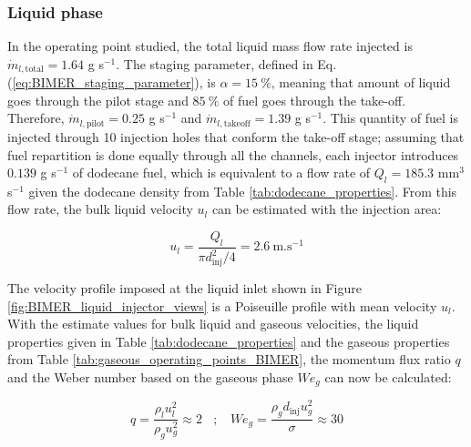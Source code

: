 \subsubsection*{Liquid phase}

In the operating point studied, the total liquid mass flow rate injected is $\dot{m}_{l,\mathrm{total}} = 1.64$ g s$^{-1}$. The staging parameter, defined in Eq. (\ref{eq:BIMER_staging_parameter}), is $\alpha = 15 ~\%$, meaning that amount of liquid goes through the pilot stage and $85 ~\%$ of fuel goes through the take-off. Therefore, $\dot{m}_{l,\mathrm{pilot}} = 0.25$ g s$^{-1}$ and $\dot{m}_{l,\mathrm{takeoff}} = 1.39$ g s$^{-1}$. This quantity of fuel is injected through 10 injection holes that conform the take-off stage; assuming that fuel repartition is done equally through all the channels, each injector introduces $0.139$ g s$^{-1}$ of dodecane fuel, which is equivalent to a flow rate of $Q_l = 185.3$  mm$^3$ s$^{-1}$ given the dodecane density from Table \ref{tab:dodecane_properties}. From this flow rate, the bulk liquid velocity $u_l$ can be estimated with the injection area:

\begin{equation}
u_l = \frac{Q_l}{\pi d_\mathrm{inj}^2 / 4} = 2.6 ~ \mathrm{m}.\mathrm{s}^{-1}
\end{equation}


The velocity profile imposed at the liquid inlet shown in Figure \ref{fig:BIMER_liquid_injector_views} is a Poiseuille profile with mean velocity $u_l$. With the estimate values for bulk liquid and gaseous velocities, the liquid properties given in Table \ref{tab:dodecane_properties} and the gaseous properties from Table \ref{tab:gaseous_operating_points_BIMER}, the momentum flux ratio $q$ and the Weber number based on the gaseous phase $We_g$ can now be calculated:


\begin{equation}
q =  \frac{\rho_l u_l^2}{\rho_g u_g^2} \approx 2 ~~~~ ; ~~~~  We_g =  \frac{\rho_g d_\mathrm{inj} u_g^2}{\sigma} \approx 30
\end{equation}

